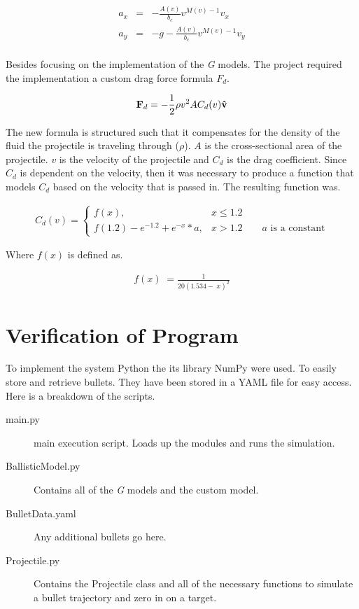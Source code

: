 \documentclass{article}%
\begin{document}
    \label{eq:drag}
    \begin{align*}
        a_x &=& - \frac{A(v)}{b_c} v^{M(v)-1}v_x\\         
        a_y &=& - g - \frac{A(v)}{b_c} v^{M(v)-1}v_y\\ 
    \end{align*}

    Besides focusing on the implementation of the {\em G} models. The project required the implementation a custom drag force formula $F_d$. 
    
    \begin{align*}
        \mathbf{F}_d= -{1 \over 2} \rho v^2 A C_d(v) \mathbf{\hat v}
    \end{align*}

    The new formula is structured such that it compensates for the density of the fluid the projectile is traveling through ($\rho$). $A$ is the cross-sectional area of the projectile. $v$ is the velocity of the projectile and $C_d$ is the drag coefficient. Since $C_d$ is dependent on the velocity, then it was necessary to produce a function that models $C_d$ based on the velocity that is passed in. The resulting function was. 
   
    \label{eq:customdrag}
    \begin{align*}
        C_d(v) = \begin{cases}
            f(x), & x\leq 1.2 \\ 
            f(1.2) - e^{-1.2} + e^{-x} * a, & x>1.2 \qquad \text{$a$ is a constant}
        \end{cases}
    \end{align*}

    Where $f(x)$ is defined as.
    
    \begin{align*}
        f\left( x \right)\; =\frac{1}{20\left( 1.534-\; x \right)^{2}} 
    \end{align*}

    \section{Verification of Program}
    To implement the system Python the its library NumPy were used. To easily store and retrieve bullets. They have been stored in a YAML\cite{1} file for easy access. Here is a breakdown of the scripts. 
    \begin{description}
        \item[main.py] main execution script. Loads up the modules and runs the simulation. 
        \item[BallisticModel.py] Contains all of the {\em G} models and the custom model. 
        \item[BulletData.yaml] Any additional bullets go here. 
        \item[Projectile.py] Contains the Projectile class and all of the necessary functions to simulate a bullet trajectory and zero in on a target. 
    \end{description}
\end{document}
